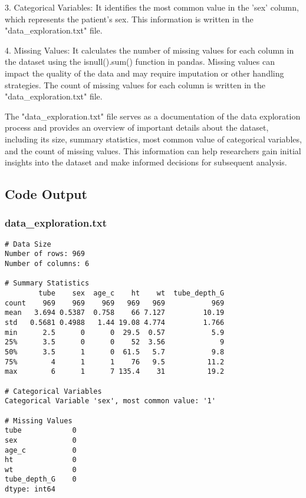 \documentclass[11pt]{article}
\begin{document}
3. Categorical Variables: It identifies the most common value in the 'sex' column, which represents the patient's sex. This information is written in the "data\_exploration.txt" file.

4. Missing Values: It calculates the number of missing values for each column in the dataset using the isnull().sum() function in pandas. Missing values can impact the quality of the data and may require imputation or other handling strategies. The count of missing values for each column is written in the "data\_exploration.txt" file.

The "data\_exploration.txt" file serves as a documentation of the data exploration process and provides an overview of important details about the dataset, including its size, summary statistics, most common value of categorical variables, and the count of missing values. This information can help researchers gain initial insights into the dataset and make informed decisions for subsequent analysis.

\subsection{Code Output}

\subsubsection*{data\_exploration.txt}

\begin{Verbatim}[tabsize=4]
# Data Size
Number of rows: 969
Number of columns: 6

# Summary Statistics
        tube    sex  age_c    ht    wt  tube_depth_G
count    969    969    969   969   969           969
mean   3.694 0.5387  0.758    66 7.127         10.19
std   0.5681 0.4988   1.44 19.08 4.774         1.766
min      2.5      0      0  29.5  0.57           5.9
25%      3.5      0      0    52  3.56             9
50%      3.5      1      0  61.5   5.7           9.8
75%        4      1      1    76   9.5          11.2
max        6      1      7 135.4    31          19.2

# Categorical Variables
Categorical Variable 'sex', most common value: '1'

# Missing Values
tube            0
sex             0
age_c           0
ht              0
wt              0
tube_depth_G    0
dtype: int64

\end{Verbatim}
\end{document}
